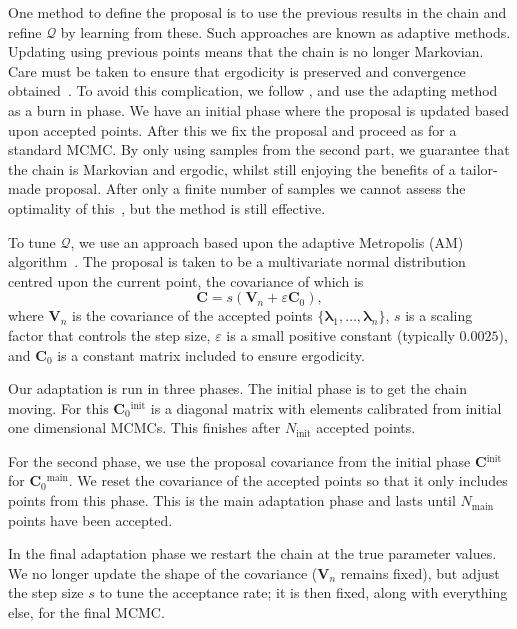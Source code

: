 \documentclass[useAMS,usedcolumn,usegraphicx,usenatbib]{mn2e}
\newcommand{\sub}[1]{\ensuremath{_\mathrm{#1}}}
\newcommand{\super}[1]{\ensuremath{^\mathrm{#1}}}
\begin{document}
One method to define the proposal is to use the previous results in the chain and refine $\mathcal{Q}$ by learning from these. Such approaches are known as adaptive methods. Updating using previous points means that the chain is no longer Markovian. Care must be taken to ensure that ergodicity is preserved and convergence obtained~\citep{Roberts2007,Andrieu2008}. To avoid this complication, we follow \citet{Haario1999}, and use the adapting method as a burn in phase. We have an initial phase where the proposal is updated based upon accepted points. After this we fix the proposal and proceed as for a standard MCMC. By only using samples from the second part, we guarantee that the chain is Markovian and ergodic, whilst still enjoying the benefits of a tailor-made proposal. After only a finite number of samples we cannot assess the optimality of this~\citep{Andrieu2008}, but the method is still effective.

To tune $\mathcal{Q}$, we use an approach based upon the adaptive Metropolis (AM) algorithm~\citep{Haario2001}. The proposal is taken to be a multivariate normal distribution centred upon the current point, the covariance of which is
\begin{equation}
\boldsymbol{C} = s \left(\boldsymbol{V}_n + \varepsilon\boldsymbol{C}_0\right),
\end{equation}
where $\boldsymbol{V}_n$ is the covariance of the accepted points $\{\boldsymbol{\lambda}_1,\ldots,\boldsymbol{\lambda}_n\}$, $s$ is a scaling factor that controls the step size, $\varepsilon$ is a small positive constant (typically $0.0025$), and $\boldsymbol{C}_0$ is a constant matrix included to ensure ergodicity.

Our adaptation is run in three phases. The initial phase is to get the chain moving. For this $\boldsymbol{C}_0\super{init}$ is a diagonal matrix with elements calibrated from initial one dimensional MCMCs. This finishes after $N\sub{init}$ accepted points.

For the second phase, we use the proposal covariance from the initial phase $\boldsymbol{C}\super{init}$ for $\boldsymbol{C}_0\super{main}$. We reset the covariance of the accepted points so that it only includes points from this phase. This is the main adaptation phase and lasts until $N\sub{main}$ points have been accepted.

In the final adaptation phase we restart the chain at the true parameter values. We no longer update the shape of the covariance ($\boldsymbol{V}_n$ remains fixed), but adjust the step size $s$ to tune the acceptance rate; it is then fixed, along with everything else, for the final MCMC.
\end{document}
